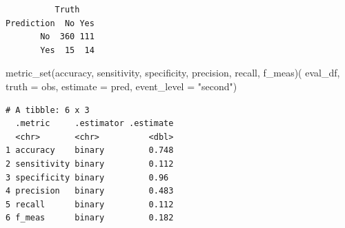 \documentclass[
  letterpaper,
  DIV=11,
  numbers=noendperiod]{scrartcl}
\newenvironment{Shaded}{\begin{snugshade}}{\end{snugshade}}
\newcommand{\AttributeTok}[1]{\textcolor[rgb]{0.40,0.45,0.13}{#1}}
\newcommand{\FunctionTok}[1]{\textcolor[rgb]{0.28,0.35,0.67}{#1}}
\newcommand{\NormalTok}[1]{\textcolor[rgb]{0.00,0.23,0.31}{#1}}
\newcommand{\StringTok}[1]{\textcolor[rgb]{0.13,0.47,0.30}{#1}}
\begin{document}
\begin{verbatim}
          Truth
Prediction  No Yes
       No  360 111
       Yes  15  14
\end{verbatim}

\begin{Shaded}
\begin{Highlighting}[]
\FunctionTok{metric\_set}\NormalTok{(accuracy, sensitivity, specificity, precision, recall, f\_meas)(}
\NormalTok{  eval\_df, }\AttributeTok{truth =}\NormalTok{ obs, }\AttributeTok{estimate =}\NormalTok{ pred, }\AttributeTok{event\_level =} \StringTok{"second"}\NormalTok{)}
\end{Highlighting}
\end{Shaded}

\begin{verbatim}
# A tibble: 6 x 3
  .metric     .estimator .estimate
  <chr>       <chr>          <dbl>
1 accuracy    binary         0.748
2 sensitivity binary         0.112
3 specificity binary         0.96 
4 precision   binary         0.483
5 recall      binary         0.112
6 f_meas      binary         0.182
\end{verbatim}
\end{document}
